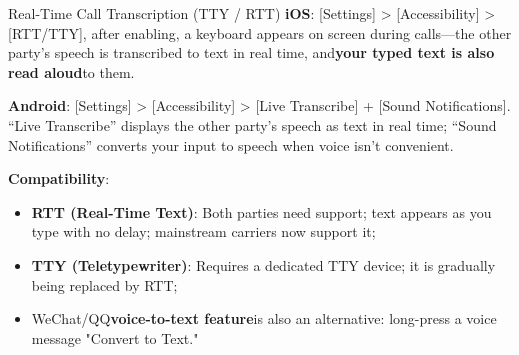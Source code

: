 \begin{tcbinfo}{Real-Time Call Transcription (TTY / RTT)}
\textbf{iOS}: [Settings] > [Accessibility] > [RTT/TTY], after enabling, a keyboard appears on screen during calls—the other party's speech is transcribed to text in real time, and\textbf{your typed text is also read aloud}to them.

\textbf{Android}: [Settings] > [Accessibility] > [Live Transcribe] + [Sound Notifications]. “Live Transcribe” displays the other party's speech as text in real time; “Sound Notifications” converts your input to speech when voice isn't convenient.

\textbf{Compatibility}:

\begin{itemize}
  \item \textbf{RTT (Real-Time Text)}: Both parties need support; text appears as you type with no delay; mainstream carriers now support it;
  \item \textbf{TTY (Teletypewriter)}: Requires a dedicated TTY device; it is gradually being replaced by RTT;
  \item WeChat/QQ\textbf{voice-to-text feature}is also an alternative: long-press a voice message "Convert to Text."
\end{itemize}

\end{tcbinfo}


